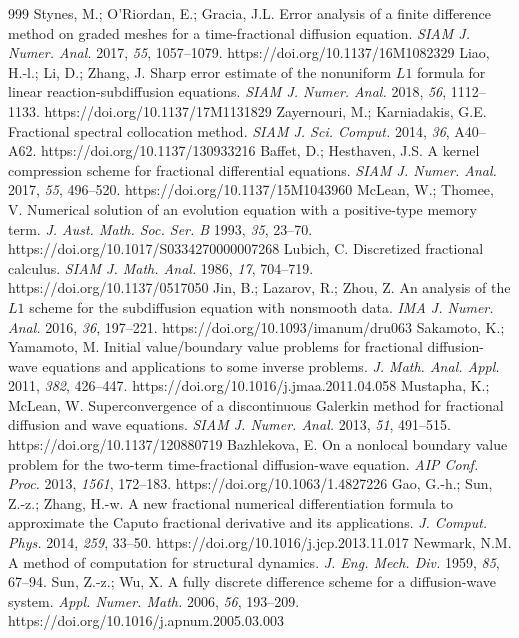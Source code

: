 \documentclass[a4paper,fleqn]{cas-sc}
\begin{document}
\begin{thebibliography}{999}
 Stynes, M.; O'Riordan, E.; Gracia, J.L. Error analysis of a finite difference method on graded meshes for a time-fractional diffusion equation. \textit{SIAM J. Numer. Anal.} 2017, \textit{55}, 1057--1079. https://doi.org/10.1137/16M1082329
 Liao, H.-l.; Li, D.; Zhang, J. Sharp error estimate of the nonuniform $L1$ formula for linear reaction-subdiffusion equations. \textit{SIAM J. Numer. Anal.} 2018, \textit{56}, 1112--1133. https://doi.org/10.1137/17M1131829
 Zayernouri, M.; Karniadakis, G.E. Fractional spectral collocation method. \textit{SIAM J. Sci. Comput.} 2014, \textit{36}, A40--A62. https://doi.org/10.1137/130933216
 Baffet, D.; Hesthaven, J.S. A kernel compression scheme for fractional differential equations. \textit{SIAM J. Numer. Anal.} 2017, \textit{55}, 496--520. https://doi.org/10.1137/15M1043960
 McLean, W.; Thomee, V. Numerical solution of an evolution equation with a positive-type memory term. \textit{J. Aust. Math. Soc. Ser. B} 1993, \textit{35}, 23--70. https://doi.org/10.1017/S0334270000007268
 Lubich, C. Discretized fractional calculus. \textit{SIAM J. Math. Anal.} 1986, \textit{17}, 704--719. https://doi.org/10.1137/0517050
 Jin, B.; Lazarov, R.; Zhou, Z. An analysis of the $L1$ scheme for the subdiffusion equation with nonsmooth data. \textit{IMA J. Numer. Anal.} 2016, \textit{36}, 197--221. https://doi.org/10.1093/imanum/dru063
 Sakamoto, K.; Yamamoto, M. Initial value/boundary value problems for fractional diffusion-wave equations and applications to some inverse problems. \textit{J. Math. Anal. Appl.} 2011, \textit{382}, 426--447. https://doi.org/10.1016/j.jmaa.2011.04.058
 Mustapha, K.; McLean, W. Superconvergence of a discontinuous Galerkin method for fractional diffusion and wave equations. \textit{SIAM J. Numer. Anal.} 2013, \textit{51}, 491--515. https://doi.org/10.1137/120880719
 Bazhlekova, E. On a nonlocal boundary value problem for the two-term time-fractional diffusion-wave equation. \textit{AIP Conf. Proc.} 2013, \textit{1561}, 172--183. https://doi.org/10.1063/1.4827226
 Gao, G.-h.; Sun, Z.-z.; Zhang, H.-w. A new fractional numerical differentiation formula to approximate the Caputo fractional derivative and its applications. \textit{J. Comput. Phys.} 2014, \textit{259}, 33--50. https://doi.org/10.1016/j.jcp.2013.11.017
 Newmark, N.M. A method of computation for structural dynamics. \textit{J. Eng. Mech. Div.} 1959, \textit{85}, 67--94.
 Sun, Z.-z.; Wu, X. A fully discrete difference scheme for a diffusion-wave system. \textit{Appl. Numer. Math.} 2006, \textit{56}, 193--209. https://doi.org/10.1016/j.apnum.2005.03.003
\end{thebibliography}
\end{document}
